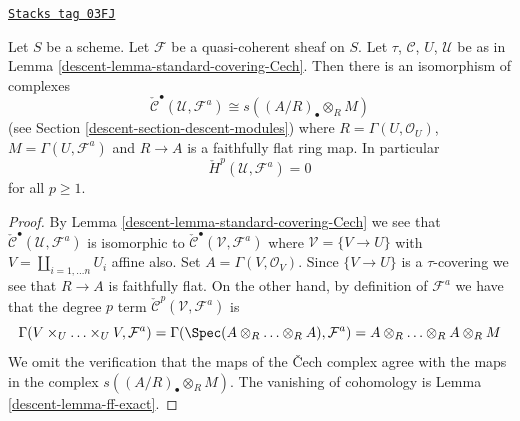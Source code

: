 \begin{lemma}
\label{descent-lemma-standard-covering-Cech-quasi-coherent}
\href{https://stacks.math.columbia.edu/tag/03FJ}{\texttt{Stacks tag 03FJ}}

Let $S$ be a scheme. Let $\mathcal{F}$ be a quasi-coherent sheaf on $S$.
Let $\tau$, $\mathcal{C}$, $U$, $\mathcal{U}$ be as in
Lemma \ref{descent-lemma-standard-covering-Cech}. Then there is an isomorphism
of complexes
$$
\check{\mathcal{C}}^\bullet(\mathcal{U}, \mathcal{F}^a)
\cong
s((A/R)_\bullet \otimes_R M)
$$
(see Section \ref{descent-section-descent-modules})
where $R = \Gamma(U, \mathcal{O}_U)$, $M = \Gamma(U, \mathcal{F}^a)$
and $R \to A$ is a faithfully flat ring map. In particular
$$
\check{H}^p(\mathcal{U}, \mathcal{F}^a) = 0
$$
for all $p \geq 1$.
\end{lemma}

\begin{proof}

By Lemma \ref{descent-lemma-standard-covering-Cech} we see that
$\check{\mathcal{C}}^\bullet(\mathcal{U}, \mathcal{F}^a)$
is isomorphic to $\check{\mathcal{C}}^\bullet(\mathcal{V}, \mathcal{F}^a)$
where $\mathcal{V} = \{V \to U\}$ with $V = \coprod_{i = 1, \ldots n} U_i$
affine also. Set $A = \Gamma(V, \mathcal{O}_V)$. Since $\{V \to U\}$
is a $\tau$-covering we see that $R \to A$ is faithfully flat.
On the other hand, by definition of $\mathcal{F}^a$ we have
that the degree $p$ term $\check{\mathcal{C}}^p(\mathcal{V}, \mathcal{F}^a)$
is
$$
\Gamma(V \times_U \ldots \times_U V, \mathcal{F}^a)
=
\Gamma(\Spec(A \otimes_R \ldots \otimes_R A), \mathcal{F}^a)
=
A \otimes_R \ldots \otimes_R A \otimes_R M
$$
We omit the verification that the maps of the {\v C}ech complex agree with
the maps in the complex $s((A/R)_\bullet \otimes_R M)$. The vanishing
of cohomology is Lemma \ref{descent-lemma-ff-exact}.
\end{proof}

